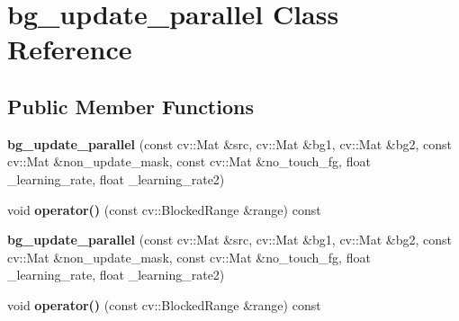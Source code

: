 \hypertarget{classbg__update__parallel}{}\section{bg\+\_\+update\+\_\+parallel Class Reference}
\label{classbg__update__parallel}
\subsection*{Public Member Functions}
\begin{DoxyCompactItemize}
\item 
\hypertarget{classbg__update__parallel_aa7f19f05768b79cdfd963a4fff18e315}{}\label{classbg__update__parallel_aa7f19f05768b79cdfd963a4fff18e315} 
{\bfseries bg\+\_\+update\+\_\+parallel} (const cv\+::\+Mat \&src, cv\+::\+Mat \&bg1, cv\+::\+Mat \&bg2, const cv\+::\+Mat \&non\+\_\+update\+\_\+mask, const cv\+::\+Mat \&no\+\_\+touch\+\_\+fg, float \+\_\+learning\+\_\+rate, float \+\_\+learning\+\_\+rate2)
\item 
\hypertarget{classbg__update__parallel_afe8c47ecac8fb0b4af9ed0e4e4689cda}{}\label{classbg__update__parallel_afe8c47ecac8fb0b4af9ed0e4e4689cda} 
void {\bfseries operator()} (const cv\+::\+Blocked\+Range \&range) const
\item 
\hypertarget{classbg__update__parallel_aa7f19f05768b79cdfd963a4fff18e315}{}\label{classbg__update__parallel_aa7f19f05768b79cdfd963a4fff18e315} 
{\bfseries bg\+\_\+update\+\_\+parallel} (const cv\+::\+Mat \&src, cv\+::\+Mat \&bg1, cv\+::\+Mat \&bg2, const cv\+::\+Mat \&non\+\_\+update\+\_\+mask, const cv\+::\+Mat \&no\+\_\+touch\+\_\+fg, float \+\_\+learning\+\_\+rate, float \+\_\+learning\+\_\+rate2)
\item 
\hypertarget{classbg__update__parallel_afe8c47ecac8fb0b4af9ed0e4e4689cda}{}\label{classbg__update__parallel_afe8c47ecac8fb0b4af9ed0e4e4689cda} 
void {\bfseries operator()} (const cv\+::\+Blocked\+Range \&range) const
\end{DoxyCompactItemize}
